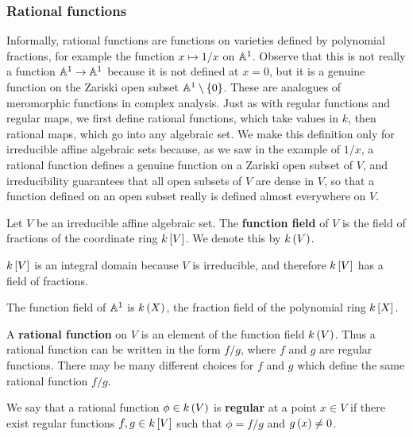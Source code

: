 \pagebreak

\subsubsection{Rational functions}

Informally, rational functions are functions on varieties defined by polynomial fractions, for example the function $ x \mapsto 1 / x $ on $ \AA^1 $. Observe that this is not really a function $ \AA^1 \to \AA^1 $ because it is not defined at $ x = 0 $, but it is a genuine function on the Zariski open subset $ \AA^1 \setminus \cbr{0} $. These are analogues of meromorphic functions in complex analysis. Just as with regular functions and regular maps, we first define rational functions, which take values in $ k $, then rational maps, which go into any algebraic set. We make this definition only for irreducible affine algebraic sets because, as we saw in the example of $ 1 / x $, a rational function defines a genuine function on a Zariski open subset of $ V $, and irreducibility guarantees that all open subsets of $ V $ are dense in $ V $, so that a function defined on an open subset really is defined almost everywhere on $ V $.

\begin{definition*}
Let $ V $ be an irreducible affine algebraic set. The \textbf{function field} of $ V $ is the field of fractions of the coordinate ring $ k\sbr{V} $. We denote this by $ k\br{V} $.
\end{definition*}

\begin{note*}
$ k\sbr{V} $ is an integral domain because $ V $ is irreducible, and therefore $ k\sbr{V} $ has a field of fractions.
\end{note*}

\begin{example*}
The function field of $ \AA^1 $ is $ k\br{X} $, the fraction field of the polynomial ring $ k\sbr{X} $.
\end{example*}

\begin{definition*}
A \textbf{rational function} on $ V $ is an element of the function field $ k\br{V} $. Thus a rational function can be written in the form $ f / g $, where $ f $ and $ g $ are regular functions. There may be many different choices for $ f $ and $ g $ which define the same rational function $ f / g $.
\end{definition*}

\begin{definition*}
We say that a rational function $ \phi \in k\br{V} $ is \textbf{regular} at a point $ x \in V $ if there exist regular functions $ f, g \in k\sbr{V} $ such that $ \phi = f / g $ and $ g\br{x} \ne 0 $.
\end{definition*}

